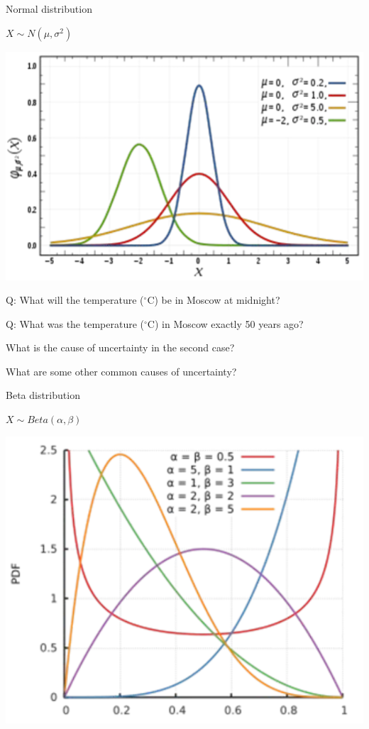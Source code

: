 \begin{frame}{Normal distribution}
\begin{center}

$X \sim N(\mu, \sigma^2)$

\includegraphics[width=0.50\linewidth]{../LectureAssets/L01/dist_N}

\bigskip
\pause
{\color{red} Q:} What will the temperature ($^\circ$C) be in Moscow at midnight?
\pause
\bigskip

{\color{red} Q:} What was the temperature ($^\circ$C) in Moscow exactly 50 years ago?
\bigskip
\pause
\end{center}
\begin{scriptsize}
What is the cause of uncertainty in the second case?

\vspace{-0.3cm}

What are some other common causes of uncertainty?
\end{scriptsize}

\end{frame}

\begin{frame}{Beta distribution}
\centering

$X \sim Beta(\alpha, \beta)$

\includegraphics[width=0.50\linewidth]{../LectureAssets/L01/dist_B}

\bigskip

\bigskip
\end{frame}


